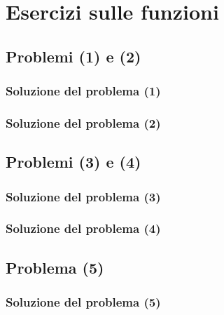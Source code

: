 \chapter{Esercizi sulle funzioni}

\section{Problemi (1) e (2)}

\subsection{Soluzione del problema (1)}

\subsection{Soluzione del problema (2)}

\section{Problemi (3) e (4)}

\subsection{Soluzione del problema (3)}

\subsection{Soluzione del problema (4)}

\section{Problema (5)}

\subsection{Soluzione del problema (5)}

